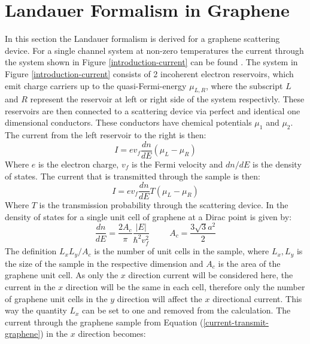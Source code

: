 		\section{Landauer Formalism in Graphene}
		\label{Introduction - Landauer Formalism in Graphene}
			In this section the Landauer formalism is derived for a graphene scattering device. For a single channel system at non-zero temperatures the current through the system shown in Figure \ref{introduction-current} can be found \cite{b6}.
			 The system in Figure \ref{introduction-current} consists of 2 incoherent electron reservoirs, which emit charge carriers up to the quasi-Fermi-energy $\mu_{L,R}$, where the subscript $L$ and $R$ represent the reservoir at left or right side of the system respectivly. These reservoirs are then connected to a scattering device via perfect and identical one dimensional conductors. These conductors have chemical potentials $\mu_{1}$ and $\mu_{2}$. The current from the left reservoir to the right is then:
			\begin{equation}
				I=ev_{f}\frac{dn}{dE}\left(\mu_{L}-\mu_{R}\right)
				\label{current-dos}
			\end{equation}
			Where $e$ is the electron charge, $v_{f}$ is the Fermi velocity and $dn/dE$ is the density of states. The current that is transmitted through the sample is then:
			\begin{equation}
				I=ev_{f}\frac{dn}{dE}T\left(\mu_{L}-\mu_{R}\right)
				\label{current-transmit-graphene}
			\end{equation}
			Where $T$ is the transmission probability through the scattering device. In \cite{b1} the density of states for a single unit cell of graphene at a Dirac point is given by:
			\begin{equation}
				\frac{dn}{dE}=\frac{2A_{c}}{\pi}\frac{|E|}{\hbar^{2}v_{f}^{2}}
				\hspace{1cm}
				A_{c}=\frac{3\sqrt{3}a^{2}}{2}
			\end{equation}
			The definition $L_{x}L_{y}/A_{c}$ is the number of unit cells in the sample, where  $L_{x}, L_{y}$ is the size of the sample in the respective dimension and $A_{c}$ is the area of the graphene unit cell. As only the $x$ direction current will be considered here, the current in the $x$ direction will be the same in each cell, therefore only the number of graphene unit cells in the $y$ direction will affect the $x$ directional current. This way the quantity $L_{x}$ can be set to one and removed from the calculation. The current through the graphene sample from Equation (\ref{current-transmit-graphene}) in the $x$ direction becomes:
